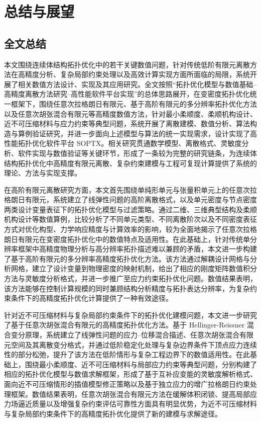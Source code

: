 \chapter{总结与展望}
\label{chap:summary_outlook}


\section{全文总结}
\label{sec:full_text_summary}

本文围绕连续体结构拓扑优化中的若干关键数值问题，针对传统低阶有限元离散方法在高精度分析、复杂局部约束处理以及高效计算实现方面所面临的局限，系统开展了相关数值方法设计、实现及其应用研究。全文按照“拓扑优化模型与数值基础--高精度离散方法研究--高性能软件平台实现”的总体思路展开，在变密度拓扑优化统一框架下，围绕任意次拉格朗日有限元、基于高阶有限元的多分辨率拓扑优化方法以及任意次胡张混合有限元等高精度数值方法，针对最小柔顺度、柔顺机构设计、近不可压缩材料与应力约束等典型问题，系统开展了离散建模、数值分析、算法构造与算例验证研究，并进一步面向上述模型与算法的统一实现需求，设计实现了高性能拓扑优化软件平台 SOPTX。相关研究贯通数学模型、离散格式、灵敏度分析、软件实现与数值验证等关键环节，形成了一条较为完整的研究链条，为连续体结构拓扑优化中高精度有限元离散、复杂约束建模与工程可复现计算提供了系统的理论、方法与实现支撑。

在高阶有限元离散研究方面，本文首先围绕单纯形单元与张量积单元上的任意次拉格朗日有限元，系统建立了线弹性问题的高阶离散格式，以及单元密度与节点密度两类设计变量表征下的拓扑优化模型与过滤策略。通过二维、三维典型结构及柔顺机构设计等数值算例，比较分析了不同单元类型、不同离散阶次以及不同密度表征方式对优化构型、力学响应精度与计算效率的影响，较为全面地揭示了任意次拉格朗日有限元在变密度拓扑优化中的数值特点及适用性。在此基础上，针对传统单分辨率框架中高精度物理分析与高分辨率拓扑描述难以兼顾的矛盾，本文进一步构建了基于高阶有限元的多分辨率高精度拓扑优化方法。该方法通过解耦设计网格与分析网格，建立了设计变量到物理密度的映射机制，给出了相应的刚度矩阵数值积分方法与灵敏度分析格式，并进一步推广至应力约束拓扑优化问题。数值结果表明，该方法能够在控制计算规模的同时兼顾结构分析精度与拓扑表达分辨率，为复杂约束条件下的高精度拓扑优化计算提供了一种有效途径。

针对近不可压缩材料与复杂局部约束条件下的拓扑优化建模问题，本文进一步研究了基于任意次胡张混合有限元的高精度拓扑优化方法。基于 Hellinger-Reissner 混合变分原理，系统建立了线弹性问题的应力--位移混合描述、任意次胡张混合有限元空间及其离散变分格式，并通过低阶稳定化处理与复杂边界条件下顶点应力连续性的部分松弛，提升了该方法在低阶情形与复杂工程边界下的数值适用性。在此基础上，围绕最小柔顺度、近不可压缩材料与局部应力约束等典型问题，分别构建了相应的拓扑优化模型与数值求解框架，形成了基于互补应变能的灵敏度解析格式、面向近不可压缩情形的插值模型修正策略以及基于独立应力的增广拉格朗日约束处理框架。数值结果表明，任意次胡张混合有限元方法在缓解体积闭锁、提高局部应力场逼近质量以及增强复杂约束评估可靠性方面具有明显优势，为近不可压缩材料与复杂局部约束条件下的高精度拓扑优化提供了新的建模与求解途径。

